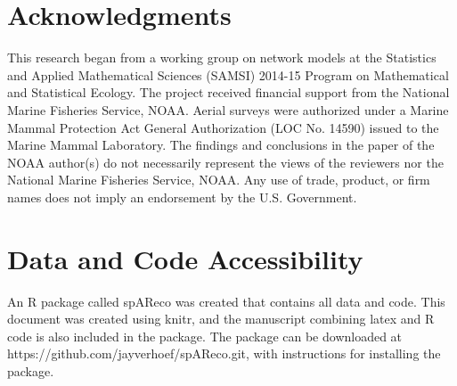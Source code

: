 \documentclass[11pt, titlepage]{article}\usepackage[]{graphicx}\usepackage[]{color}
\begin{document}
\begin{spacing}{1.9}
\begin{flushleft}
\section*{Acknowledgments} 

This research began from a working group on network models at the Statistics and Applied Mathematical Sciences (SAMSI) 2014-15 Program on Mathematical and Statistical Ecology. The project received financial support from the National Marine Fisheries Service, NOAA. Aerial surveys were authorized under a Marine Mammal Protection Act General Authorization (LOC No. 14590) issued to the Marine Mammal Laboratory. The findings and conclusions in the paper of the NOAA author(s) do not necessarily represent the views of the reviewers nor the National Marine Fisheries Service, NOAA. Any use of trade, product, or firm names does not imply an endorsement by the U.S. Government. 

\section*{Data and Code Accessibility}

An R package called spAReco was created that contains all data and code. This document was created using knitr, and the manuscript combining latex and R code is also included in the package.  The package can be downloaded at https://github.com/jayverhoef/spAReco.git, with instructions for installing the package.


%
%
%





\end{flushleft}
\end{spacing}
\end{document}

